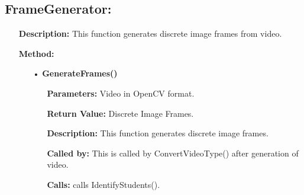 \documentclass{scrreprt}
\begin{document}
\subsection{FrameGenerator:}
\begin{enumerate}
\item[] \textbf{Description:} This function generates discrete image frames from video.
\item[] \textbf{Method:}
\begin{itemize}
\item [•] \textbf{GenerateFrames()}
\begin{itemize}
\item [] \textbf{Parameters:} Video in OpenCV format.
\item [] \textbf{Return Value:} Discrete Image Frames.
\item [] \textbf{Description:} This function generates discrete image frames.
\item [] \textbf{Called by:} This is called by ConvertVideoType() after generation of video.  
\item [] \textbf{Calls:} calls IdentifyStudents().
\end{itemize}
\end{itemize}
\end{enumerate}
\end{document}
